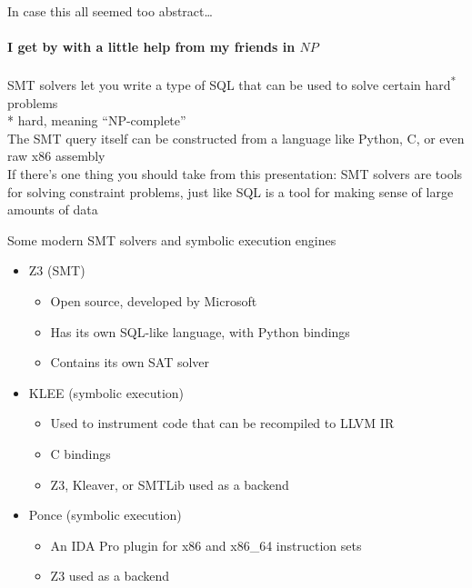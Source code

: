 \begin{frame}{In case this all seemed too abstract\ldots}
    \framesubtitle{I get by with a little help from my friends in $NP$}
    \begin{center}
        {\Large
            SMT solvers let you write a type of SQL \alert{that
            can be used to solve certain hard\textsuperscript{*} problems}
        } \pause \\
        * hard, meaning ``NP-complete'' \pause \\
        \vspace{0.3in}
        {\Large
            The SMT query itself can be constructed from a language like
            Python, C, or even raw x86 assembly
        } \pause \\
        \vspace{0.3in}
        {\Large
            If there's one thing you should take from this presentation:
            SMT solvers are tools for solving constraint problems, just like
            SQL is a tool for making sense of large amounts of data
        }
    \end{center}
\end{frame}

\begin{frame}{Some modern SMT solvers and symbolic execution engines}
    \begin{itemize}
        \item<1-> \alert<4->{Z3} (SMT)
        \begin{itemize}
            \item<1-> Open source, developed by Microsoft
            \item<1-> Has its own SQL-like language, with Python bindings
            \item<1-> Contains its own SAT solver
        \end{itemize}
        \item<2-> KLEE (symbolic execution)
        \begin{itemize}
            \item<2-> Used to instrument code that can be recompiled to LLVM IR
            \item<2-> C bindings
            \item<2-> Z3, Kleaver, or SMTLib used as a backend
        \end{itemize}
        \item<3-> Ponce (symbolic execution)
        \begin{itemize}
            \item<3-> An IDA Pro plugin for x86 and x86\_64 instruction sets
            \item<3-> Z3 used as a backend
        \end{itemize}
    \end{itemize}

\end{frame}


